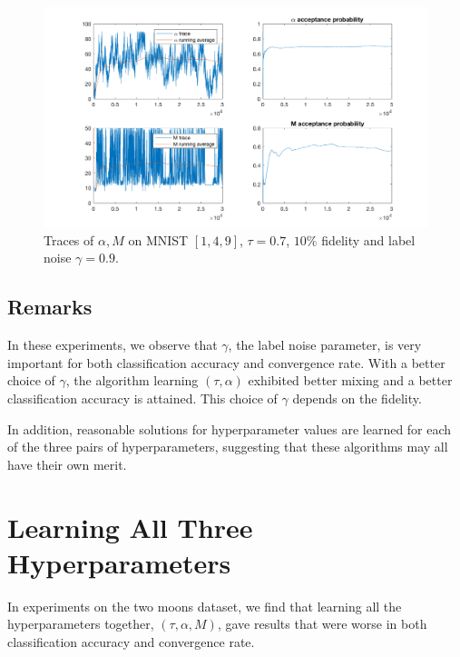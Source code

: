 \documentclass{siamart1116}
\begin{document}
        \begin{figure}[!htb]
        \centering
        \caption{\label{aM_mnist_1}Traces of $\alpha, M$ on MNIST $[1, 4, 9]$, $\tau = 0.7$, $10\%$ fidelity and label noise $\gamma = 0.9$.}
        \includegraphics[width=0.8\linewidth]{choose_hyp/a_M/tau=0_7.png}
        \end{figure}

    \subsection{Remarks}
        In these experiments, we observe that $\gamma$, the label noise parameter, is very important for both classification accuracy and convergence rate. With a better choice of $\gamma$, the algorithm learning $(\tau, \alpha)$ exhibited better mixing and a better classification accuracy is attained. This choice of $\gamma$ depends on the fidelity.

        In addition, reasonable solutions for hyperparameter values are learned for each of the three pairs of hyperparameters, suggesting that these algorithms may all have their own merit. 

\section{Learning All Three Hyperparameters}
    In experiments on the two moons dataset, we find that learning all the hyperparameters together, $(\tau, \alpha, M)$, gave results that were worse in both classification accuracy and convergence rate.
\end{document}
